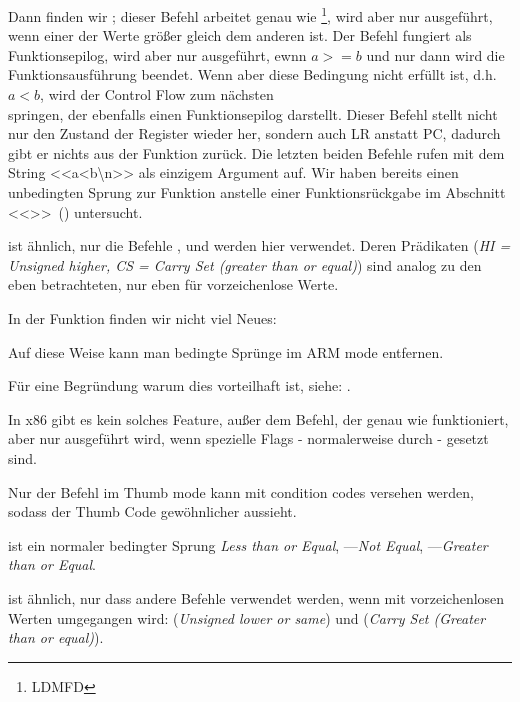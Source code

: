 Dann finden wir ; dieser Befehl arbeitet genau wie \footnote{\ac{LDMFD}}, wird aber nur
ausgeführt, wenn einer der Werte größer gleich dem anderen ist. 
Der Befehl  fungiert als Funktionsepilog, wird aber nur ausgeführt, ewnn $a>=b$ und nur
dann wird die Funktionsausführung beendet.
Wenn aber diese Bedingung nicht erfüllt ist, d.h. $a<b$, wird der Control Flow zum nächsten \\
 springen, der ebenfalls einen Funktionsepilog darstellt. Dieser Befehl stellt nicht nur
den Zustand der  Register wieder her, sondern auch \ac{LR} anstatt \ac{PC}, dadurch gibt er nichts aus der
Funktion zurück.
Die letzten beiden Befehle rufen \printf mit dem String <<a<b\textbackslash{}n>> als einzigem Argument auf.
Wir haben bereits einen unbedingten Sprung zur Funktion \printf anstelle einer Funktionsrückgabe im Abschnitt
<<\PrintfSeveralArgumentsSectionName>>~() untersucht.

 ist ähnlich, nur die Befehle ,  und  werden hier verwendet.
Deren Prädikaten (\emph{HI = Unsigned higher, CS = Carry Set (greater than or equal)}) sind analog zu den eben
betrachteten, nur eben für vorzeichenlose Werte. 

In der Funktion \main finden wir nicht viel Neues:


Auf diese Weise kann man bedingte Sprünge im ARM mode entfernen.


Für eine Begründung warum dies vorteilhaft ist, siehe: .

In x86 gibt es kein solches Feature, außer dem  Befehl, der genau wie \MOV funktioniert, aber nur ausgeführt
wird, wenn spezielle Flags - normalerweise durch \CMP - gesetzt sind.


\mysubparagraph{\OptimizingKeilVI (\ThumbMode)}



Nur der  Befehl im Thumb mode kann mit condition codes versehen werden, sodass der Thumb Code gewöhnlicher
aussieht.


 ist ein normaler bedingter Sprung \emph{Less than or Equal}, 
---\emph{Not Equal}, 
---\emph{Greater than or Equal}.

 ist ähnlich, nur dass andere Befehle verwendet werden, wenn mit vorzeichenlosen Werten umgegangen wird:
 (\emph{Unsigned lower or same}) und  (\emph{Carry Set (Greater than or equal)}).
